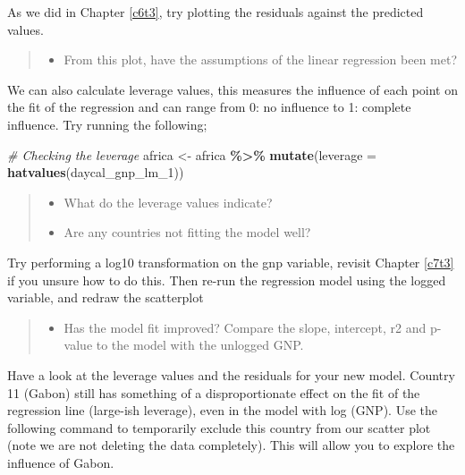 \documentclass[
]{book}
\newenvironment{Shaded}{\begin{snugshade}}{\end{snugshade}}
\newcommand{\AttributeTok}[1]{\textcolor[rgb]{0.13,0.29,0.53}{#1}}
\newcommand{\CommentTok}[1]{\textcolor[rgb]{0.56,0.35,0.01}{\textit{#1}}}
\newcommand{\FunctionTok}[1]{\textcolor[rgb]{0.13,0.29,0.53}{\textbf{#1}}}
\newcommand{\NormalTok}[1]{#1}
\newcommand{\OtherTok}[1]{\textcolor[rgb]{0.56,0.35,0.01}{#1}}
\newcommand{\SpecialCharTok}[1]{\textcolor[rgb]{0.81,0.36,0.00}{\textbf{#1}}}
\providecommand{\tightlist}{%
  \setlength{\itemsep}{0pt}\setlength{\parskip}{0pt}}
\begin{document}
As we did in Chapter \ref{c6t3}, try plotting the residuals against the predicted values.

\begin{quote}
\begin{itemize}
\tightlist
\item
  From this plot, have the assumptions of the linear regression been met?
\end{itemize}
\end{quote}

We can also calculate leverage values, this measures the influence of each point on the fit of the regression and can range from 0: no influence to 1: complete influence. Try running the following;

\begin{Shaded}
\begin{Highlighting}[]
\CommentTok{\# Checking the leverage }
\NormalTok{africa }\OtherTok{\textless{}{-}}\NormalTok{ africa }\SpecialCharTok{\%\textgreater{}\%}
  \FunctionTok{mutate}\NormalTok{(}\AttributeTok{leverage =} \FunctionTok{hatvalues}\NormalTok{(daycal\_gnp\_lm\_1))}
\end{Highlighting}
\end{Shaded}

\begin{quote}
\begin{itemize}
\tightlist
\item
  What do the leverage values indicate?
\item
  Are any countries not fitting the model well?
\end{itemize}
\end{quote}

Try performing a log10 transformation on the gnp variable, revisit Chapter \ref{c7t3} if you unsure how to do this. Then re-run the regression model using the logged variable, and redraw the scatterplot

\begin{quote}
\begin{itemize}
\tightlist
\item
  Has the model fit improved? Compare the slope, intercept, r2 and p-value to the model with the unlogged GNP.
\end{itemize}
\end{quote}

Have a look at the leverage values and the residuals for your new model. Country 11 (Gabon) still has something of a disproportionate effect on the fit of the regression line (large-ish leverage), even in the model with log (GNP). Use the following command to temporarily exclude this country from our scatter plot (note we are not deleting the data completely). This will allow you to explore the influence of Gabon.
\end{document}
